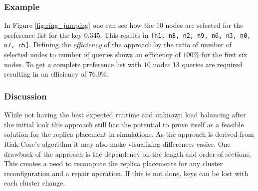 \subsubsection{Example}
In Figure \ref{fig:ring_jumping} one can see how the $10$ nodes are selected for the preference list for the key $0.345$.
This results in \lstinline![n1, n8, n2, n9, n6, n3, n0, n7, n5]!.
Defining the \emph{efficiency} of the approach by the ratio of number of selected nodes to number of queries shows an efficiency of $100\%$ for the first six nodes.
To get a complete preference list with $10$ nodes 13 queries are required resulting in an efficiency of $76.9\%$.

\subsubsection{Discussion}
While not having the best expected runtime and unknown load balancing after the initial look this approach still has the potential to prove itself as a feasible solution for the replica placement in simulations.
As the approach is derived from Riak Core's algorithm it may also make visualizing differences easier.
One drawback of the approach is the dependency on the length and order of sections.
This creates a need to recompute the replica placements for any cluster reconfiguration and a repair operation.
If this is not done, keys can be lost with each cluster change.